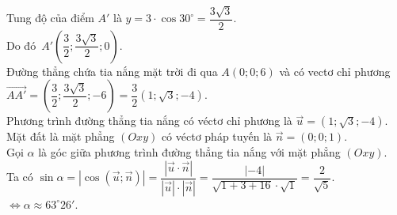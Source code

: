 \begin{bt}
{		Tung độ của điểm $A'$ là $y=3 \cdot \cos 30^\circ=\dfrac{3\sqrt{3}}{2}$.\\
		Do đó $A'\left(\dfrac{3}{2};\dfrac{3\sqrt{3}}{2};0\right)$.\\
		Đường thẳng chứa tia nắng mặt trời đi qua $A(0;0;6)$ và có vectơ chỉ phương \\ $\overrightarrow{AA'}=\left(\dfrac{3}{2};\dfrac{3\sqrt{3}}{2};-6\right)=\dfrac{3}{2}\left(1;\sqrt{3};-4\right)$.\\
		Phương trình đường thẳng tia nắng có véctơ chỉ phương là $\overrightarrow{u}=\left(1;\sqrt{3};-4\right)$.\\
		Mặt đất là mặt phẳng $\left(Oxy\right)$ có véctơ pháp tuyến là $\overrightarrow{n}=\left(0;0;1\right)$.\\
		Gọi $\alpha $ là góc giữa phương trình đường thẳng tia nắng với mặt phẳng $\left(Oxy\right)$.\\
		Ta có $\sin \alpha 
		=\left| \cos \left(\overrightarrow{u};\overrightarrow{n}\right)\right|
		=\dfrac{\left| \overrightarrow{u} \cdot \overrightarrow{n}\right|}
		{\left| \overrightarrow{u}\right| \cdot \left| \overrightarrow{n}\right|}
		=\dfrac{\left| -4\right|}{\sqrt{1+3+16} \cdot \sqrt{1}}=\dfrac{2}{\sqrt{5}}$.\\
		$\Leftrightarrow \alpha \approx{63^\circ}26'$.}
\end{bt}

